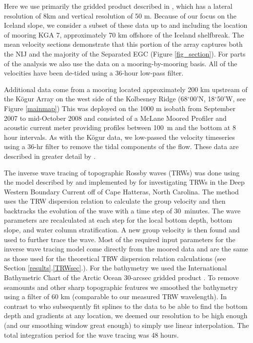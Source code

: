 \documentclass[12pt,titlepage,figuresatend]{article}
\begin{document}
Here we use primarily the gridded product described in \cite{Harden2016}, which has a lateral resolution of 8km and vertical resolution of 50 m. Because of our focus on the Iceland slope, we consider a subset of these data up to and including the location of mooring KGA 7, approximately 70 km offshore of the Iceland shelfbreak. The mean velocity sections demonstrate that this portion of the array captures both the NIJ and the majority of the Separated EGC (Figure \ref{fig_section}). For parts of the analysis we also use the data on a mooring-by-mooring basis. All of the velocities have been de-tided using a 36-hour low-pass filter.

Additional data come from a mooring located approximately 200 km upstream of the K\"{o}gur Array on the west side of the Kolbesney Ridge (68$^{\circ}$00'N, 18$^{\circ}$50'W, see Figure \ref{mainmap}) This was deployed on the 1000 m isobath from September 2007 to mid-October 2008 and consisted of a McLane Moored Profiler and acoustic current meter providing profiles between 100~m and the bottom at 8 hour intervals. As with the K\"{o}gur data, we low-passed the velocity timeseries using a 36-hr filter to remove the tidal components of the flow. These data are described in greater detail by \cite{Jonsson2012}.

The inverse wave tracing of topographic Rossby waves (TRWs) was done using the model described by \cite{Meinen1993} and implemented by \cite{Pickart1995} for investigating TRWs in the Deep Western Boundary Current off of Cape Hatteras, North Carolina. The method uses the TRW dispersion relation to calculate the group velocity and then backtracks the evolution of the wave with a time step of 30~minutes. The wave parameters are recalculated at each step for the local bottom depth, bottom slope, and water column stratification. A new group velocity is then found and used to further trace the wave. Most of the required input parameters for the inverse wave tracing model come directly from the moored data and are the same as those used for the theoretical TRW dispersion relation calculations (see Section \ref{results}.\ref{TRWsec}.). For the bathymetry we used the International Bathymetric Chart of the Arctic Ocean 30-arcsec gridded product \cite[]{Jakobsson2012}. To remove seamounts and other sharp topographic features we smoothed the bathymetry using a filter of 60 km (comparable to our measured TRW wavelength). In contrast to \cite{Pickart1995} who subsequently fit splines to the data to be able to find the bottom depth and gradients at any location, we deemed our resolution to be high enough (and our smoothing window great enough) to simply use linear interpolation. The total integration period for the wave tracing was 48 hours.
\end{document}
